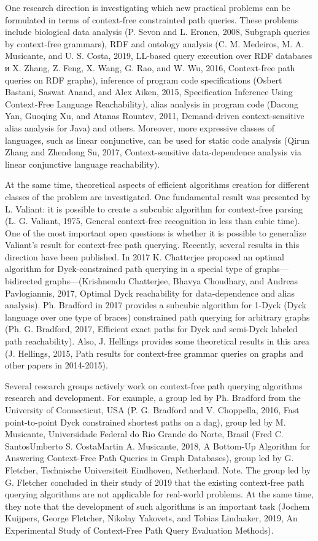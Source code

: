 \documentclass[12pt]{article}  %
\theoremstyle{remark}
\begin{document}
One research direction is investigating which new practical problems can be formulated in terms of context-free constrainted path queries. These problems include biological data analysis (P. Sevon and L. Eronen, 2008, Subgraph queries by context-free grammars), RDF and ontology analysis (C. M. Medeiros, M. A. Musicante, and U. S. Costa, 2019, LL-based query execution over RDF databases и X. Zhang, Z. Feng, X. Wang, G. Rao, and W. Wu, 2016, Context-free path queries on RDF graphs), inference of program code specifications (Osbert Bastani, Saswat Anand, and Alex Aiken, 2015, Specification Inference Using Context-Free Language Reachability), alias analysis in program code (Dacong Yan, Guoqing Xu, and Atanas Rountev, 2011, Demand-driven context-sensitive alias analysis for Java) and others. Moreover, more expressive classes of languages, such as linear conjunctive, can be used for static code analysis (Qirun Zhang and Zhendong Su, 2017, Context-sensitive data-dependence analysis via linear conjunctive language reachability).

At the same time, theoretical aspects of efficient algorithms creation for different classes of the problem are investigated. One fundamental result was presented by L. Valiant: it is possible to create a subcubic algorithm for context-free parsing (L. G. Valiant, 1975, General context-free recognition in less than cubic time). One of the most important open questions is whether it is possible to generalize Valiant's result for context-free path querying. Recently, several results in this direction have been published. In 2017 K. Chatterjee proposed an optimal algorithm for Dyck-constrained path querying in a special type of graphs—bidirected graphs—(Krishnendu Chatterjee, Bhavya Choudhary, and Andreas Pavlogiannis, 2017, Optimal Dyck reachability for data-dependence and alias analysis). Ph. Bradford in 2017 provides a subcubic algorithm for 1-Dyck (Dyck language over one type of braces) constrained path querying for arbitrary graphs (Ph. G. Bradford, 2017, Efficient exact paths for Dyck and semi-Dyck labeled path reachability). Also, J. Hellings provides some theoretical results in this area (J. Hellings, 2015, Path results for context-free grammar queries on graphs and other papers in 2014-2015).

Several research groups actively work on context-free path querying algorithms research and development. For example, a group led by Ph. Bradford from the University of Connecticut, USA (P. G. Bradford and V. Choppella, 2016, Fast point-to-point Dyck constrained shortest paths on a dag), group led by M. Musicante, Universidade Federal do Rio Grande do Norte, Brasil (Fred C. SantosUmberto S. CostaMartin A. Musicante, 2018, A Bottom-Up Algorithm for Answering Context-Free Path Queries in Graph Databases), group led by G. Fletcher, Technische Universiteit Eindhoven, Netherland. Note. The group led by G. Fletcher concluded in their study of 2019 that the existing context-free path querying algorithms are not applicable for real-world problems. At the same time, they note that the development of such algorithms is an important task (Jochem Kuijpers, George Fletcher, Nikolay Yakovets, and Tobias Lindaaker, 2019, An Experimental Study of Context-Free Path Query Evaluation Methods).
\end{document}
